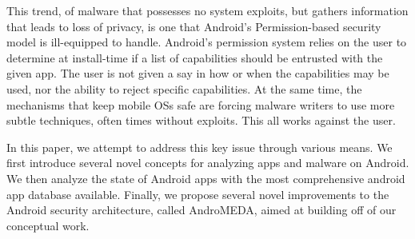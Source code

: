 This trend, of malware that possesses no system exploits, but gathers information that leads to loss of privacy, is one that Android's Permission-based security model is ill-equipped to handle. Android's permission system relies on the user to determine at install-time if a list of capabilities should be entrusted with the given app. The user is not given a say in how or when the capabilities may be used, nor the ability to reject specific capabilities. At the same time, the mechanisms that keep mobile OSs safe are forcing malware writers to use more subtle techniques, often times without exploits. This all works against the user.

In this paper, we attempt to address this key issue through various means. We first introduce several novel concepts for analyzing apps and malware on Android. We then analyze the state of Android apps with the most comprehensive android app database available. Finally, we propose several novel improvements to the Android security architecture, called AndroMEDA, aimed at building off of our conceptual work.

